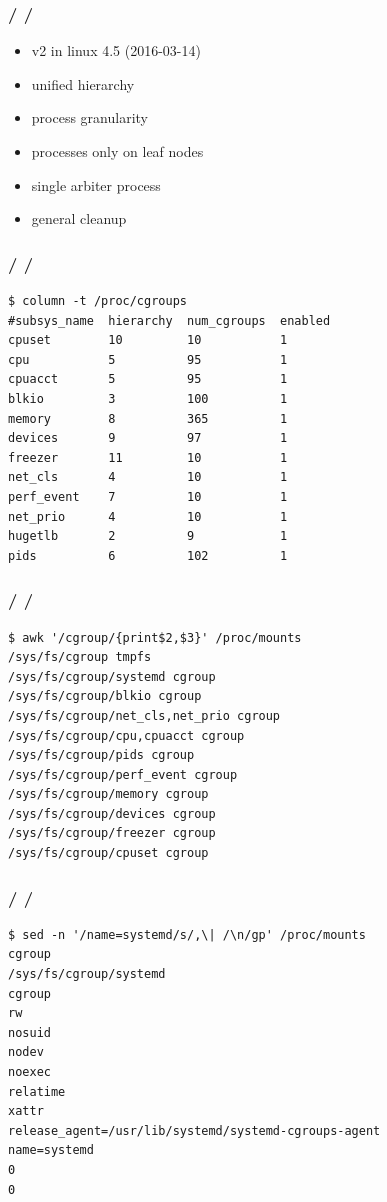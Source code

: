 \documentclass{beamer}
\newcommand{\autotitle}
{\frametitle{
    \secname
    \ifx\insertsubsection\empty
    \else
        /\subsecname
        \ifx\insertsubsubsection\empty\else/\subsubsecname\fi
    \fi}}
\begin{document}
\begin{frame}
    \autotitle
    \begin{itemize}
        \item v2 in linux 4.5 (2016-03-14)
        \item unified hierarchy
        \item process granularity
        \item processes only on leaf nodes
        \item single arbiter process
        \item general cleanup
    \end{itemize}
\end{frame}

\begin{frame}[fragile]
    \autotitle
        \begin{verbatim}
$ column -t /proc/cgroups
#subsys_name  hierarchy  num_cgroups  enabled
cpuset        10         10           1
cpu           5          95           1
cpuacct       5          95           1
blkio         3          100          1
memory        8          365          1
devices       9          97           1
freezer       11         10           1
net_cls       4          10           1
perf_event    7          10           1
net_prio      4          10           1
hugetlb       2          9            1
pids          6          102          1
    \end{verbatim}
\end{frame}

\begin{frame}[fragile]
    \autotitle
    \begin{verbatim}
$ awk '/cgroup/{print$2,$3}' /proc/mounts
/sys/fs/cgroup tmpfs
/sys/fs/cgroup/systemd cgroup
/sys/fs/cgroup/blkio cgroup
/sys/fs/cgroup/net_cls,net_prio cgroup
/sys/fs/cgroup/cpu,cpuacct cgroup
/sys/fs/cgroup/pids cgroup
/sys/fs/cgroup/perf_event cgroup
/sys/fs/cgroup/memory cgroup
/sys/fs/cgroup/devices cgroup
/sys/fs/cgroup/freezer cgroup
/sys/fs/cgroup/cpuset cgroup
    \end{verbatim}
\end{frame}

\begin{frame}[fragile]
    \autotitle
    \begin{verbatim}
$ sed -n '/name=systemd/s/,\| /\n/gp' /proc/mounts
cgroup
/sys/fs/cgroup/systemd
cgroup
rw
nosuid
nodev
noexec
relatime
xattr
release_agent=/usr/lib/systemd/systemd-cgroups-agent
name=systemd
0
0
    \end{verbatim}
\end{frame}
\end{document}
